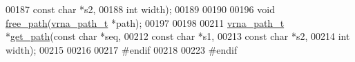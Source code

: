 \begin{DoxyCode}
00187                 \textcolor{keyword}{const} \textcolor{keywordtype}{char}  *s2,
00188                 \textcolor{keywordtype}{int}         width);
00189 
00190 
00196 \textcolor{keywordtype}{void}    \mbox{\hyperlink{group__direct__paths_ga9056421d716ae89f0ed3f107627f395b}{free\_path}}(\mbox{\hyperlink{group__direct__paths_structvrna__path__s}{vrna\_path\_t}} *path);
00197 
00198 
00211 \mbox{\hyperlink{group__direct__paths_structvrna__path__s}{vrna\_path\_t}} *\mbox{\hyperlink{group__direct__paths_gac009a44db824f90a6de5f9c28b9b3222}{get\_path}}(\textcolor{keyword}{const} \textcolor{keywordtype}{char}  *seq,
00212                       \textcolor{keyword}{const} \textcolor{keywordtype}{char}  *s1,
00213                       \textcolor{keyword}{const} \textcolor{keywordtype}{char}  *s2,
00214                       \textcolor{keywordtype}{int}         width);
00215 
00216 
00217 \textcolor{preprocessor}{#endif}
00218 
00223 \textcolor{preprocessor}{#endif}
\end{DoxyCode}
